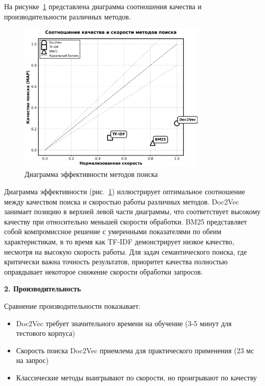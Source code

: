 На рисунке~\ref{fig:efficiency_scatter} представлена диаграмма соотношения качества и производительности различных методов.

\begin{figure}[H]
	\centering
	\includegraphics[width=0.8\textwidth]{images/diploma_bw_plots/efficiency_scatter_bw.png}
	\caption{Диаграмма эффективности методов поиска}
	\label{fig:efficiency_scatter}
\end{figure}

Диаграмма эффективности (рис.~\ref{fig:efficiency_scatter}) иллюстрирует оптимальное соотношение между качеством поиска и скоростью работы различных методов. Doc2Vec занимает позицию в верхней левой части диаграммы, что соответствует высокому качеству при относительно меньшей скорости обработки. BM25 представляет собой компромиссное решение с умеренными показателями по обеим характеристикам, в то время как TF-IDF демонстрирует низкое качество, несмотря на высокую скорость работы. Для задач семантического поиска, где критически важна точность результатов, приоритет качества полностью оправдывает некоторое снижение скорости обработки запросов.

\textbf{2. Производительность}

Сравнение производительности показывает:
\begin{itemize}
	\item Doc2Vec требует значительного времени на обучение (3-5 минут для тестового корпуса)
	\item Скорость поиска Doc2Vec приемлема для практического применения (23 мс на запрос)
	\item Классические методы выигрывают по скорости, но проигрывают по качеству
\end{itemize}

